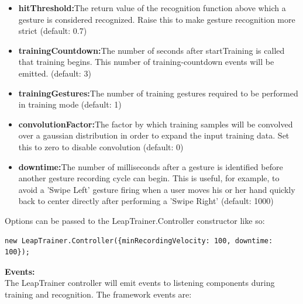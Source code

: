 \documentclass[11pt,a4paper]{article}
\begin{document}
\begin{itemize}
    \item \textbf{hitThreshold:}The return value of the recognition function above which a gesture is considered recognized. Raise this to make gesture recognition more strict (default: 0.7)
    \item \textbf{trainingCountdown:}The number of seconds after startTraining is called that training begins. This number of training-countdown events will be emitted. (default: 3)
    \item \textbf{trainingGestures:}The number of training gestures required to be performed in training mode (default: 1)
    \item \textbf{convolutionFactor:}The factor by which training samples will be convolved over a gaussian distribution in order to expand the input training data. Set this to zero to disable convolution (default: 0)
    \item \textbf{downtime:}The number of milliseconds after a gesture is identified before another gesture recording cycle can begin. This is useful, for example, to avoid a 'Swipe Left' gesture firing when a user moves his or her hand quickly back to center directly after performing a 'Swipe Right' (default: 1000)
\end{itemize}
\vspace{1cm}
Options can be passed to the LeapTrainer.Controller constructor like so:
\vspace{.5cm}
\begin{lstlisting}
new LeapTrainer.Controller({minRecordingVelocity: 100, downtime: 100});
\end{lstlisting}
\newpage
\textbf{Events:}
\vspace{.5cm}\\
The LeapTrainer controller will emit events to listening components during training and recognition.
\vspace{.5cm}
The framework events are:
\end{document}
